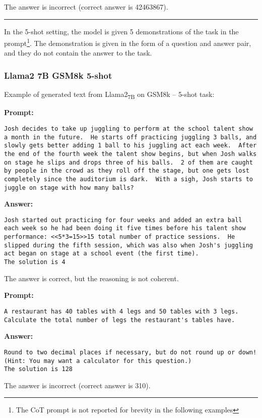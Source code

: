 The answer is incorrect (correct answer is 42463867).

\noindent\rule{\textwidth}{0.4pt}

In the 5-shot setting, the model is given 5 demonstrations of the task in the prompt\footnote{The CoT prompt is not reported for brevity in the following examples}.
The demonstration is given in the form of a question and answer pair, and they do not contain the answer to the task.

\subsubsection*{Llama2 7B GSM8k 5-shot}
\noindent Example of generated text from Llama2\textsubscript{7B} on GSM8k -- 5-shot task:
\begin{displayquote}
	\textbf{Prompt:}
	\begin{Verbatim}[fontsize=\small,breaklines]
Josh decides to take up juggling to perform at the school talent show a month in the future.  He starts off practicing juggling 3 balls, and slowly gets better adding 1 ball to his juggling act each week.  After the end of the fourth week the talent show begins, but when Josh walks on stage he slips and drops three of his balls.  2 of them are caught by people in the crowd as they roll off the stage, but one gets lost completely since the auditorium is dark.  With a sigh, Josh starts to juggle on stage with how many balls?
	\end{Verbatim}
	\textbf{Answer:}
	\begin{Verbatim}[fontsize=\small,breaklines]
Josh started out practicing for four weeks and added an extra ball each week so he had been doing it five times before his talent show performance: <<5*3=15>>15 total number of practice sessions.  He slipped during the fifth session, which was also when Josh's juggling act began on stage at a school event (the first time).
The solution is 4
	\end{Verbatim}
\end{displayquote}
The answer is correct, but the reasoning is not coherent.
\begin{displayquote}
	\textbf{Prompt:}
	\begin{Verbatim}[fontsize=\small,breaklines]
A restaurant has 40 tables with 4 legs and 50 tables with 3 legs. Calculate the total number of legs the restaurant's tables have.
	\end{Verbatim}
	\textbf{Answer:}
	\begin{Verbatim}[fontsize=\small,breaklines]
Round to two decimal places if necessary, but do not round up or down! (Hint: You may want a calculator for this question.)
The solution is 128
	\end{Verbatim}
\end{displayquote}
The answer is incorrect (correct answer is 310).

